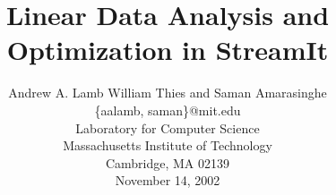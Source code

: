 \documentclass{sig-alternate}
\title{Linear Data Analysis and Optimization in StreamIt}
\author{
\alignauthor \vspace{-18pt}
Andrew A. Lamb
William Thies
and Saman Amarasinghe\\
	\vspace{8pt}
	\{aalamb, saman\}@mit.edu \\
	\vspace{8pt}
	Laboratory for Computer Science \\
	Massachusetts Institute of Technology \\
	Cambridge, MA  02139 \\
	\vspace{8pt}
        November 14, 2002}
\begin{document}
\maketitle

\begin{abstract}

\end{abstract}















\clearpage

\appendix

\end{document}

